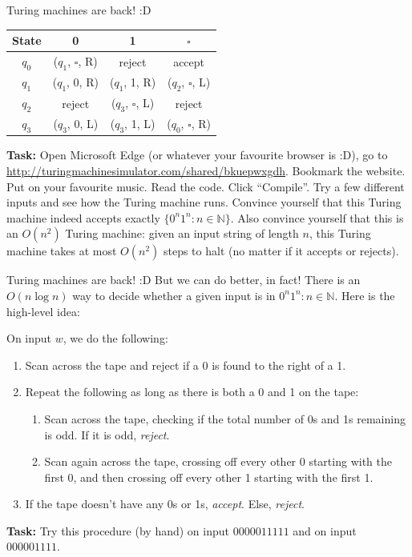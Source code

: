\documentclass{beamer}
\begin{document}
\begin{frame}{Turing machines are back! :D}

\begin{center}
\begin{tabular}{c|c|c|c}
State & 0 & 1 & $\square$\\
\hline
$q_0$ & ($q_1$, $\square$, R) & reject & accept\\
\hline
$q_1$ & ($q_1$, 0, R) & ($q_1$, 1, R) & ($q_2$, $\square$, L)\\
\hline
$q_2$ & reject & ($q_3$, $\square$, L) & reject\\
\hline
$q_3$ & ($q_3$, 0, L) & ($q_3$, 1, L) & ($q_0$, $\square$, R)\\
\end{tabular}
\end{center}

\textbf{Task:} Open Microsoft Edge (or whatever your favourite browser is :D), go to \url{http://turingmachinesimulator.com/shared/bkuepwxgdh}. Bookmark the website. Put on your favourite music. Read the code. Click ``Compile''. Try a few different inputs and see how the Turing machine runs. Convince yourself that this Turing machine indeed accepts exactly $\{0^n 1^n: n \in \mathbb N\}$. Also convince yourself that this is an $O(n^2)$ Turing machine: given an input string of length $n$, this Turing machine takes at most $O(n^2)$ steps to halt (no matter if it accepts or rejects).

\end{frame}

\begin{frame}{Turing machines are back! :D}
But we can do better, in fact! There is an $O(n \log n)$ way to decide whether a given input is in ${0^n 1^n: n \in \mathbb N}$. Here is the high-level idea:

On input $w$, we do the following:
\begin{enumerate}
\item Scan across the tape and reject if a 0 is found to the right of a 1.
\item Repeat the following as long as there is both a 0 and 1 on the tape:
\begin{enumerate}
\item Scan across the tape, checking if the total number of 0s and 1s remaining is odd. If it is odd, \textit{reject}.
\item Scan again across the tape, crossing off every other 0 starting with the first 0, and then crossing off every other 1 starting with the first 1.
\end{enumerate}
\item If the tape doesn't have any 0s or 1s, \textit{accept}. Else, \textit{reject}.
\end{enumerate}

\textbf{Task: } Try this procedure (by hand) on input $0000011111$ and on input $000001111$.
\end{frame}
\end{document}
